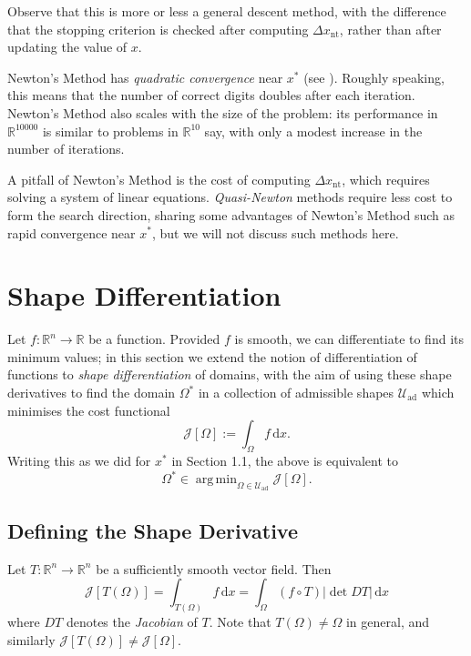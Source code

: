 \documentclass[a4paper,11pt]{article}
\DeclareMathOperator*{\argmin}{arg\,min}
\begin{document}
\vspace{3mm}

Observe that this is more or less a general descent method, with the difference that the stopping criterion is checked after computing $\Delta x_{\text{nt}}$, rather than after updating the value of $x$.

\vspace{3mm}

Newton's Method has \textit{quadratic convergence} near $x^*$ (see \cite{convex}). Roughly speaking, this means that the number of correct digits doubles after each iteration. Newton's Method also scales with the size of the problem: its performance in $\mathbb{R}^{10000}$ is similar to problems in $\mathbb{R}^{10}$ say, with only a modest increase in the number of iterations.

\vspace{3mm}

A pitfall of Newton's Method is the cost of computing $\Delta x_{\text{nt}}$, which requires solving a system of linear equations. \textit{Quasi-Newton} methods require less cost to form the search direction, sharing some advantages of Newton's Method such as rapid convergence near $x^*$, but we will not discuss such methods here.

\newpage

\section{Shape Differentiation}

Let $f:\mathbb{R}^n\rightarrow \mathbb{R}$ be a function. Provided $f$ is smooth, we can differentiate to find its minimum values; in this section we extend the notion of differentiation of functions to \textit{shape differentiation} of domains, with the aim of using these shape derivatives to find the domain $\Omega^*$ in a collection of admissible shapes $\mathcal{U}_{\text{ad}}$ which minimises the cost functional $$\mathcal{J}[\Omega]:=\int_\Omega f \, \text{d}x.$$ Writing this as we did for $x^*$ in Section 1.1, the above is equivalent to $$\Omega^* \in \argmin_{\Omega \in \mathcal{U}_{\text{ad}}} \mathcal{J}[\Omega].$$

\subsection{Defining the Shape Derivative}

Let $T:\mathbb{R}^n\rightarrow\mathbb{R}^n$ be a sufficiently smooth vector field. Then $$\mathcal{J}[T(\Omega)]=\int_{T(\Omega)}f\,\text{d}x=\int_\Omega (f\circ T)|\det DT|\, \text{d}x$$ where $DT$ denotes the \textit{Jacobian} of $T$. Note that $T(\Omega)\neq \Omega$ in general, and similarly $\mathcal{J}[T(\Omega)]\neq \mathcal{J}[\Omega]$.
\end{document}
